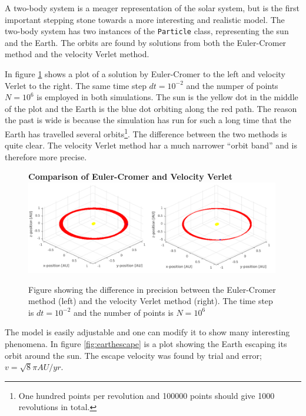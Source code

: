 \documentclass[10pt,a4paper]{amsart}
\begin{document}
A two-body system is a meager representation of the solar system, but is the first important stepping stone towards a more interesting and realistic model. The two-body system has two instances of the \lstinline|Particle| class, representing the sun and the Earth. The orbits are found by solutions from both the Euler-Cromer method and the velocity Verlet method. 

In figure \ref{fig:earthcompare} shows a plot of a solution by Euler-Cromer to the left and velocity Verlet to the right. The same time step $dt=10^{-2}$ and the numper of points $N=10^6$ is employed in both simulations. The sun is the yellow dot in the middle of the plot and the Earth is the blue dot orbiting along the red path. The reason the past is wide is because the simulation has run for such a long time that the Earth has travelled several orbits\footnote{One hundred points per revolution and 100000 points should give 1000 revolutions in total.}. The difference between the two methods is quite clear. The velocity Verlet method har a much narrower ``orbit band'' and is therefore more precise.

\begin{figure}
	\centering
	\textbf{Comparison of Euler-Cromer and Velocity Verlet}
	\includegraphics[width=0.99\textwidth]{../figures/earthcompare.png}
	\caption{Figure showing the difference in precision between the Euler-Cromer method (left) and the velocity Verlet method (right). The time step is $dt=10^{-2}$ and the number of points is $N=10^6$\label{fig:earthcompare}}
\end{figure}

The model is easily adjustable and one can modify it to show many interesting phenomena. In figure \ref{fig:earthescape} is a plot showing the Earth escaping its orbit around the sun. The escape velocity was found by trial and error; $v=\sqrt{8}\pi AU/yr$.
\end{document}
